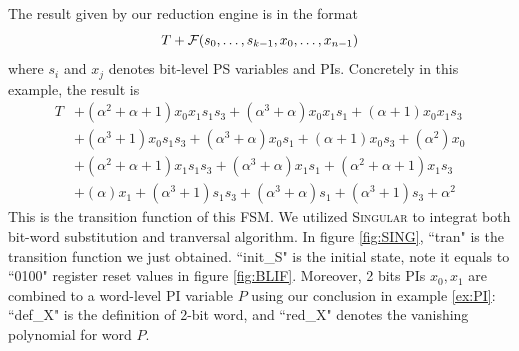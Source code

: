 \begin{Example}
\begin{figure}[hbt]
\end{figure}

The result given by our reduction engine is in the format 
$$T+{\mathcal{F}}(s_0,\dots,s_{k-1},x_0,\dots,x_{n-1})$$ 
where $s_i$ and $x_j$ denotes bit-level PS variables and PIs. Concretely in this example, the result is
\begin{align*}
T&+(\alpha^2+\alpha+1) x_0 x_1 s_1 s_3+(\alpha^3+\alpha) x_0 x_1 s_1+(\alpha+1) x_0 x_1 s_3 \\
&+(\alpha^3+1) x_0 s_1 s_3+(\alpha^3+\alpha) x_0 s_1 +(\alpha+1) x_0 s_3+(\alpha^2) x_0 \\
&+(\alpha^2+\alpha+1) x_1 s_1 s_3+(\alpha^3+\alpha) x_1 s_1+(\alpha^2+\alpha+1) x_1 s_3\\
&+(\alpha) x_1+(\alpha^3+1) s_1 s_3+(\alpha^3+\alpha) s_1+(\alpha^3+1) s_3+\alpha^2
\end{align*}
This is the transition function of this FSM. We utilized \textsc{Singular} to integrat both 
bit-word substitution and tranversal algorithm. In figure \ref{fig:SING}, ``tran" is the transition
function we just obtained. ``init\_S" is the initial state, note it equals to ``0100" register 
reset values in figure \ref{fig:BLIF}. Moreover, 2 bits PIs $x_0,x_1$ are combined to a word-level 
PI variable $P$ using our conclusion in example \ref{ex:PI}: ``def\_X" is the definition of 2-bit 
word, and ``red\_X" denotes the vanishing polynomial for word $P$.


\end{Example}
